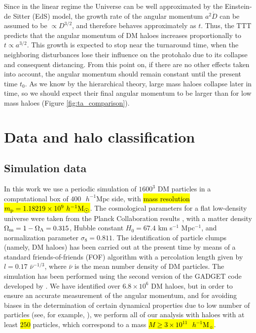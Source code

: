 \documentclass[fleqn,usenatbib]{mnras}
\newcommand{\hMpc}{{\textrm{ $h^{-1}$Mpc}}}
\newcommand{\hMsun}{{\textrm{ $h^{-1}$M$_{\sun}$}}}
\begin{document}
Since in the linear regime the Universe can be well approximated by the Einstein-de Sitter (EdS) model, the growth rate of the angular momentum $a^2\dot{D}$ can be assumed to be $\propto D^{3/2}$, and therefore behaves approximately as $t$. Thus, the TTT predicts that the angular momentum of DM haloes increases proportionally to $t\propto a^{3/2}$. This growth is expected to stop near the turnaround time, when the neighboring disturbances lose their influence on the protohalo due to its collapse and consequent distancing. From this point on, if there are no other effects taken into account, the angular momentum should remain constant until the present time $t_0$. As we know by the hierarchical theory, large mass haloes collapse later in time, so we should expect their final angular momentum to be larger than for low mass haloes (Figure \ref{fig:ta_comparison}).

\section{Data and halo classification}
\label{metodos}

\subsection{Simulation data}
\label{simulations}
In this work we use a periodic simulation of $1600^3$ DM particles in a computational box of $400\hMpc$ side, with \hl{mass resolution $m_{\rm p}= 1.18219 \times 10^{9}\hMsun$}. The cosmological parameters for a flat low-density universe were taken from the Planck Collaboration results \citep{plankcollaboration2018}, with a matter density $\Omega_{\rm m}=1-\Omega_{\Lambda}=0.315$, Hubble constant $H_{0}=67.4$ km s$^{-1}$ Mpc$^{-1}$, and normalization parameter $\sigma_{8}=0.811$. The identification of particle clumps (namely, DM haloes) has been carried out at the present time by means of a standard friends-of-friends (FOF) algorithm with a percolation length given by $l=0.17$ $\bar{\nu}^{-1/3}$, where $\bar{\nu}$ is the mean number density of DM particles. The simulation has been performed using the second version of the GADGET code developed by \citet{springeletal2005}. We have identified over $6.8\times10^6$ DM haloes, but in order to ensure an accurate measurement of the angular momentum, and for avoiding biases in the determination of certain dynamical properties due to low number of particles (see, for example, \citeauthor{bettetal2007} \citeyear{bettetal2007}), we perform all of our analysis with haloes with at least \hl{$250$} particles, which correspond to a mass \hl{$M\geqslant 3\times 10^{11}\hMsun$}.
\end{document}
